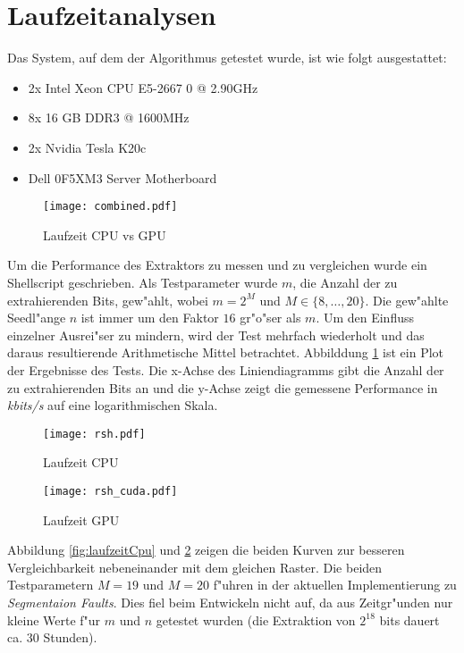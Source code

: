 \section{Laufzeitanalysen}

Das System, auf dem der Algorithmus getestet wurde, ist wie folgt ausgestattet:
\begin{itemize}
	\item 2x Intel Xeon CPU E5-2667 0 @ 2.90GHz
	\item 8x 16 GB DDR3 @ 1600MHz
	\item 2x Nvidia Tesla K20c
	\item Dell 0F5XM3 Server Motherboard
\end{itemize}


\begin{figure}
	\centering
	\vspace{-1cm}
	\texttt{[image: combined.pdf]}
	\caption{Laufzeit CPU vs GPU}
	\label{fig:laufzeitCpuGpu}
\end{figure}

Um die Performance des Extraktors zu messen und zu vergleichen wurde ein Shellscript geschrieben. Als Testparameter wurde $m$, die Anzahl der zu extrahierenden Bits, gew"ahlt, wobei $m = 2^M$ und $M \in \{8, \dots, 20\}$. Die gew"ahlte Seedl"ange $n$ ist immer um den Faktor $16$ gr"o"ser als $m$. Um den Einfluss einzelner Ausrei"ser zu mindern, wird der Test mehrfach wiederholt und das daraus resultierende Arithmetische Mittel betrachtet. Abbilddung \ref{fig:laufzeitCpuGpu} ist ein Plot der Ergebnisse des Tests. Die x-Achse des Liniendiagramms gibt die Anzahl der zu extrahierenden Bits an und die y-Achse zeigt die gemessene Performance in \emph{kbits/s} auf eine logarithmischen Skala.

\begin{figure}[h]
	\vspace{-.5cm}
	\begin{minipage}[b]{0.5\textwidth} 
		\texttt{[image: rsh.pdf]}
		\caption{Laufzeit CPU}
		\label{fig:laufzeitCpu} 
	\end{minipage}
	\hfill
	\begin{minipage}[b]{0.5\textwidth}
		\texttt{[image: rsh\_cuda.pdf]}
		\caption{Laufzeit GPU}
		\label{fig:laufzeitGpu} 
	\end{minipage}
\end{figure}

Abbildung \ref{fig:laufzeitCpu} und \ref{fig:laufzeitGpu} zeigen die beiden Kurven zur besseren Vergleichbarkeit nebeneinander mit dem gleichen Raster. Die beiden Testparametern $M=19$ und $M=20$ f"uhren in der aktuellen Implementierung zu \emph{Segmentaion Faults}. Dies fiel beim Entwickeln nicht auf, da aus Zeitgr"unden nur kleine Werte f"ur $m$ und $n$ getestet wurden (die Extraktion von $2^{18}$ bits dauert ca. 30 Stunden).

